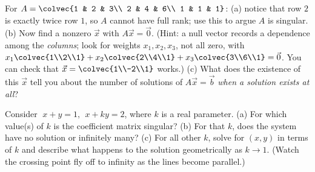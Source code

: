 \begin{exercise}
\label{ch06:ex-homog}
For $A=\colvec{1 & 2 & 3\\ 2 & 4 & 6\\ 1 & 1 & 1}$:
(a) notice that row $2$ is exactly twice row $1$, so $A$ cannot have full
rank; use this to argue $A$ is singular. (b) Now find a nonzero $\vec x$ with
$A\vec x=\vec0$. (Hint: a null vector records a dependence among the
\emph{columns}; look for weights $x_1,x_2,x_3$, not all zero, with
$x_1\colvec{1\\2\\1}+x_2\colvec{2\\4\\1}+x_3\colvec{3\\6\\1}=\vec0$. You can
check that $\vec x=\colvec{1\\-2\\1}$ works.) (c) What does the existence of
this $\vec x$ tell you about the number of solutions of $A\vec x=\vec b$
\emph{when a solution exists at all}?
\end{exercise}

\begin{exercise}
\label{ch06:ex-param}
Consider $\;x+y=1,\ \ x+ky=2$, where $k$ is a real parameter.
(a) For which value(s) of $k$ is the coefficient matrix singular?
(b) For that $k$, does the system have no solution or infinitely many?
(c) For all other $k$, solve for $(x,y)$ in terms of $k$ and describe what
happens to the solution geometrically as $k\to1$. (Watch the crossing point
fly off to infinity as the lines become parallel.)
\end{exercise}

